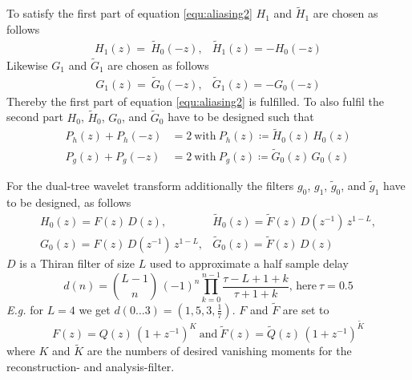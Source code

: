 \documentclass[a4paper,12pt]{book}
\begin{document}
To satisfy the first part of equation \ref{equ:aliasing2}
$H_1$ and $\widetilde{H}_1$ are chosen as follows
\begin{equation}\label{equ:fbank1}
  \begin{array}{ll}
    H_1(z)=\ \widetilde{H}_0(-z), & \widetilde{H}_1(z)=-H_0(-z)
  \end{array}
\end{equation}
Likewise $G_1$ and $\widetilde{G}_1$ are chosen as follows
\begin{equation}\label{equ:fbank2}
  \begin{array}{ll}
    G_1(z)=\ \widetilde{G}_0(-z), & \widetilde{G}_1(z)=-G_0(-z)
  \end{array}
\end{equation} %
Thereby the first part of equation \ref{equ:aliasing2} is fulfilled. To also
fulfil the second part $H_0$, $\widetilde{H}_0$, $G_0$, and $\widetilde{G}_0$
have to be designed such that
\begin{equation}\label{equ:halfband}
  \begin{split}
    P_h(z)+P_h(-z)&=2\mathrm{\ with\ }P_h(z)\coloneqq\widetilde{H}_0(z)\,H_0(z)\\
    P_g(z)+P_g(-z)&=2\mathrm{\ with\ }P_g(z)\coloneqq\widetilde{G}_0(z)\,G_0(z)
   \end{split}
\end{equation}

For the dual-tree wavelet transform additionally the filters
$g_0$, $g_1$, $\widetilde{g}_0$, and $\widetilde{g}_1$ have to be designed,
as follows
\begin{equation}\label{equ:hilbert}
  \begin{array}{ll}
    H_0(z)=F(z)\,D(z), & \widetilde{H}_0(z)=\widetilde{F}(z)\,D(z^{-1})\,z^{1-L},\\
    G_0(z)=F(z)\,D(z^{-1})\,z^{1-L}, & \widetilde{G}_0(z)=\widetilde{F}(z)\,D(z)
  \end{array}
\end{equation}
$D$ is a Thiran filter of size $L$ used to approximate a half sample
delay %
\begin{equation}\label{equ:thiran}
  d(n)=\binom{L-1}{n}\,(-1)^n\prod_{k=0}^{n-1}\frac{\tau-L+1+k}{\tau+1+k}
  \mathrm{,\,here\ }\tau=0.5
\end{equation}
\emph{E.g.} for $L=4$ we get $d(0\ldots 3)=(1,5,3,\frac{1}{7})$. $F$ and $\widetilde{F}$ are set to
\begin{equation}\label{equ:moments}
    F(z)=Q(z)\,(1+z^{-1})^K\mathrm{\ and \ }
    \widetilde{F}(z)=\widetilde{Q}(z)\,(1+z^{-1})^{\widetilde{K}}
\end{equation}
where $K$ and $\widetilde{K}$ are the numbers of desired vanishing moments
for the reconstruction- and analysis-filter.
\end{document}
